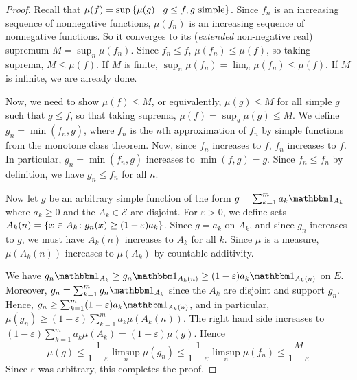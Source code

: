 \begin{proof}
	Recall that \( \mu(f) = \sup\qty{\mu(g) \mid g \leq f, g \text{ simple}} \).
	Since \( f_n \) is an increasing sequence of nonnegative functions, \( \mu(f_n) \) is an increasing sequence of nonnegative functions.
	So it converges to its (\emph{extended} non-negative real) supremum \( M = \sup_n \mu(f_n) \).
	Since \( f_n \leq f \), \( \mu(f_n) \leq \mu(f) \), so taking suprema, \( M \leq \mu(f) \).
	If \( M \) is finite, \( \sup_n \mu(f_n) = \lim_n \mu(f_n) \leq \mu(f) \).
	If \( M \) is infinite, we are already done.

	Now, we need to show \( \mu(f) \leq M \), or equivalently, \( \mu(g) \leq M \) for all simple \( g \) such that \( g \leq f \), so that taking suprema, \( \mu(f) = \sup_g \mu(g) \leq M \).
	We define \( g_n = \min (\overline f_n, g) \), where \( \overline f_n \) is the \( n \)th approximation of \( f_n \) by simple functions from the monotone class theorem.
	Now, since \( f_n \) increases to \( f \), \( \overline f_n \) increases to \( f \).
	In particular, \( g_n = \min(\overline f_n, g) \) increases to \( \min(f, g) = g \).
	Since \( \overline f_n \leq f_n \) by definition, we have \( g_n \leq f_n \) for all \( n \).

	Now let \( g \) be an arbitrary simple function of the form \( g = \sum_{k=1}^m a_k \mathbbm 1_{A_k} \) where \( a_k \geq 0 \) and the \( A_k \in \mathcal E \) are disjoint.
	For \( \varepsilon > 0 \), we define sets \( A_k(n) = \qty{x \in A_k \colon g_n(x) \geq (1-\varepsilon) a_k} \).
	Since \( g = a_k \) on \( A_k \), and since \( g_n \) increases to \( g \), we must have \( A_k(n) \) increases to \( A_k \) for all \( k \).
	Since \( \mu \) is a measure, \( \mu(A_k(n)) \) increases to \( \mu(A_k) \) by countable additivity.

	We have \( g_n \mathbbm 1_{A_k} \geq g_n \mathbbm 1_{A_k(n)} \geq (1-\varepsilon)a_k \mathbbm 1_{A_k(n)} \) on \( E \).
	Moreover, \( g_n = \sum_{k=1}^m g_n \mathbbm 1_{A_k} \) since the \( A_k \) are disjoint and support \( g_n \).
	Hence, \( g_n \geq \sum_{k=1}^m (1-\varepsilon)a_k \mathbbm 1_{A_k(n)} \), and in particular, \( \mu(g_n) \geq (1 - \varepsilon) \sum_{k=1}^m a_k \mu(A_k(n)) \).
	The right hand side increases to \( (1-\varepsilon) \sum_{k=1}^m a_k \mu(A_k) = (1-\varepsilon) \mu(g) \).
	Hence
	\[ \mu(g) \leq \frac{1}{1-\varepsilon} \limsup_n \mu(g_n) \leq \frac{1}{1-\varepsilon} \limsup_n \mu(f_n) \leq \frac{M}{1-\varepsilon} \]
	Since \( \varepsilon \) was arbitrary, this completes the proof.
\end{proof}

